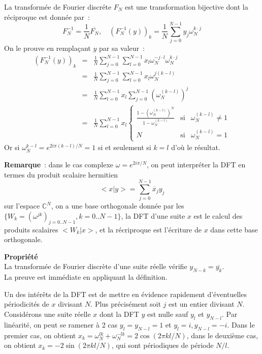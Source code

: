 \documentclass[a4paper,11pt]{article}
\newcommand{\C}{{\mathbb{C}}}
\begin{document}
\begin{giacjshere}
La transform\'ee de Fourier discr\'ete  $F_N$ est une transformation 
bijective dont la réciproque est donnée par~:
\[ F_N^{-1}=\frac{1}{N} \overline{F_N}, \quad
{(F_N^{-1}(y))}_k=\frac{1}{N}\sum_{j=0}^{N-1}y_j\omega_N^{k\cdot j}
\]
On le prouve en remplaçant $y$ par sa valeur~:
\begin{eqnarray*}
{(F_N^{-1}(y))}_k &=&
\frac{1}{N}\sum_{j=0}^{N-1} \sum_{l=0}^{N-1} x_l \omega_N^{-j\cdot l}
\omega_N^{k\cdot j} \\
&=&
\frac{1}{N}\sum_{j=0}^{N-1} \sum_{l=0}^{N-1} x_l \omega_N^{j (k-l)} \\
&=& 
\frac{1}{N} \sum_{l=0}^{N-1} x_l \sum_{j=0}^{N-1} (\omega_N^{(k-l)})^j \\
&=&
\frac{1}{N} \sum_{l=0}^{N-1} x_l 
\left\{ \begin{array}{lcl}
\frac{1-(\omega_N^{(k-l)})^N}{1-\omega_N^{(k-l)}} & \mbox{si} &
\omega_N^{(k-l)}\neq 1 \\
N & \mbox{si} & \omega_N^{(k-l)} = 1 
\end{array} \right.
\end{eqnarray*}
Or si $\omega_N^{k-l}=e^{2i\pi(k-l)/N}=1$ si et seulement si $k=l$
d'où le résultat.

{\bf Remarque}~: dans le cas complexe $\omega=e^{2i\pi/N}$, 
on peut interpr\'eter la DFT
en termes du produit scalaire hermitien
$$ <x|y>=\sum_{j=0}^{N-1} \overline{x}_j y_j$$
sur l'espace $\C^N$, on a une base orthogonale donn\'ee par 
les $\{ W_k=(\omega^{jk})_{j=0..N-1}, k=0..N-1\}$, la DFT d'une suite $x$ est le calcul
des produits scalaires $<W_k|x>$, et la r\'ecriproque est l'\'ecriture
de $x$ dans cette base orthogonale.


{\bf Propriété}\\
La transformée de Fourier discrète d'une suite réelle vérifie
$y_{N-k}=\overline{y_k}$.\\
La preuve est immédiate en appliquant la définition.

Un des intérêts de la DFT est de mettre en évidence rapidement
d'éventuelles périodicités de $x$ divisant $N$. Plus précisément
soit $j$ est un entier divisant $N$. Considérons une suite réelle $x$ dont
la DFT $y$ est nulle sauf $y_l$ et $y_{N-l}$. Par linéarité, on
peut se ramener à 2 cas $y_l=y_{N-l}=1$ et $y_l=i, y_{N-l}=-i$. Dans
le premier cas, on obtient $x_k=\omega_N^{lk}+\omega_N^{-lk}=2\cos(2\pi kl/N)$,
dans le deuxième cas, on obtient $x_k=-2\sin(2\pi kl/N)$, qui sont périodiques
de période $N/l$.


\end{giacjshere}
\end{document}
